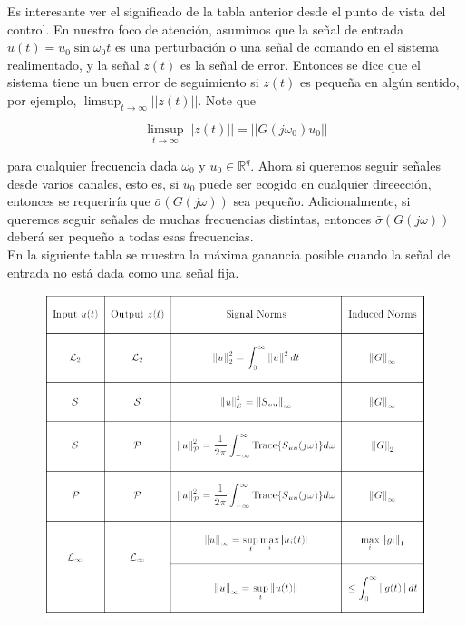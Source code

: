 Es interesante ver el significado de la tabla anterior desde el punto de vista del control. En nuestro foco de atención, asumimos que la señal de entrada $u(t)=u_0 \sin{\omega_0 t}$ es una perturbación o una señal de comando en el sistema realimentado, y la señal $z(t)$ es la señal de error. Entonces se dice que el sistema tiene un buen error de seguimiento si $z(t)$ es pequeña en algún sentido, por ejemplo, $\limsup_{t \to \infty}{||z(t)||}$. Note que

\begin{equation*}
    \limsup_{t \to \infty}{||z(t)||} = ||G(j \omega_0 )u_0||
\end{equation*}

para cualquier frecuencia dada $\omega_0$ y $u_0 \in \mathbb{R}^q$. Ahora si queremos seguir señales desde varios canales, esto es, si $u_0$ puede ser ecogido en cualquier direección, entonces se requeriría que $\bar{\sigma}( G (j \omega) )$ sea pequeño. Adicionalmente, si queremos seguir señales de muchas frecuencias distintas, entonces $\bar{\sigma}( G (j \omega) )$ deberá ser pequeño a todas esas frecuencias.\\

En la siguiente tabla se muestra la máxima ganancia posible cuando la señal de entrada no está dada como una señal fija.

\begin{figure}[H]
    \centering
    \includegraphics[scale = 0.85]{Control/controlf2.png}
\end{figure}


